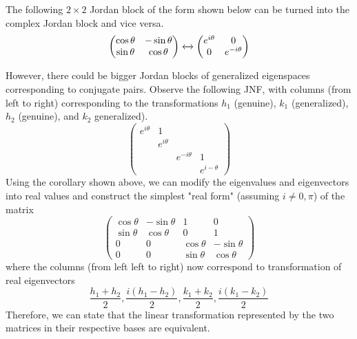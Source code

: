 \documentclass{article}
\begin{document}
    \begin{corollary}
    The following $2 \times 2$ Jordan block of the form shown below can be turned into the complex Jordan block and vice versa. 
    \[\begin{pmatrix}
    \cos{\theta} & -\sin{\theta} \\
    \sin{\theta} & \cos{\theta} 
    \end{pmatrix} \xleftrightarrow{} \begin{pmatrix}
    e^{i \theta} & 0 \\
    0 & e^{- i \theta}
    \end{pmatrix}\]
    \end{corollary}

    However, there could be bigger Jordan blocks of generalized eigenspaces corresponding to conjugate pairs. Observe the following JNF, with columns (from left to right) corresponding to the transformations $h_1$ (genuine), $k_1$ (generalized), $h_2$ (genuine), and $k_2$ generalized). 
    \[\begin{pmatrix}
    e^{i \theta} & 1 & & \\
    & e^{i \theta} & & \\
    & & e^{-i \theta} & 1 \\
    & & & e^{i- \theta}
    \end{pmatrix}\]
    Using the corollary shown above, we can modify the eigenvalues and eigenvectors into real values and construct the simplest "real form" (assuming $i \neq 0, \pi$) of the matrix 
    \[\begin{pmatrix}
    \cos{\theta} & - \sin{\theta} & 1 & 0 \\
    \sin{\theta} & \cos{\theta} & 0 & 1 \\
    0 & 0 & \cos{\theta} & - \sin{\theta} \\
    0 & 0 & \sin{\theta} & \cos{\theta}
    \end{pmatrix}\]
    where the columns (from left left to right) now correspond to transformation of real eigenvectors
    \[\frac{h_1 + h_2}{2}, \frac{i(h_1 - h_2)}{2}, \frac{k_1 + k_2}{2}, \frac{i(k_1 - k_2)}{2}\]
    Therefore, we can state that the linear transformation represented by the two matrices in their respective bases are equivalent. 
\end{document}
